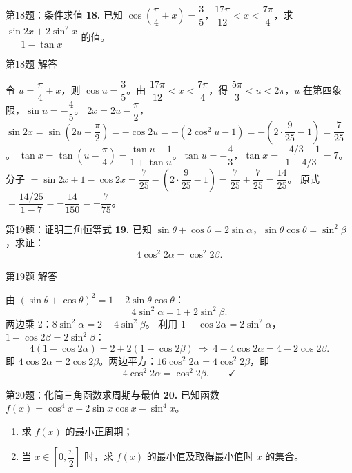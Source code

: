 \documentclass[10pt,aspectratio=169,serif]{beamer}
\begin{document}
\begin{frame}[t]{第18题：条件求值}
\textbf{18.} 已知 $\cos\!\left(\dfrac{\pi}{4}+x\right)=\dfrac35$，$\dfrac{17\pi}{12}<x<\dfrac{7\pi}{4}$，求 $\dfrac{\sin 2x+2\sin^2 x}{1-\tan x}$ 的值。
\end{frame}

\begin{frame}[t]{第18题 解答}
\begin{tcolorbox}[colback=orange!10,colframe=orange,title=\textbf{解}]
令 $u=\dfrac{\pi}{4}+x$，则 $\cos u=\dfrac35$。由 $\dfrac{17\pi}{12}<x<\dfrac{7\pi}{4}$，得 $\dfrac{5\pi}{3}<u<2\pi$，$u$ 在第四象限，$\sin u=-\dfrac45$。
$2x=2u-\dfrac{\pi}{2}$，$\sin 2x=\sin(2u-\dfrac{\pi}{2})=-\cos 2u=-(2\cos^2 u-1)=-(2\cdot\dfrac9{25}-1)=\dfrac7{25}$。
$\tan x=\tan(u-\dfrac{\pi}{4})=\dfrac{\tan u-1}{1+\tan u}$。$\tan u=-\dfrac43$，$\tan x=\dfrac{-4/3-1}{1-4/3}=7$。
分子 $=\sin 2x+1-\cos 2x=\dfrac7{25}-(2\cdot\dfrac9{25}-1)=\dfrac7{25}+\dfrac7{25}=\dfrac{14}{25}$。
原式 $=\dfrac{14/25}{1-7}=-\dfrac{14}{150}=-\dfrac{7}{75}$。
\end{tcolorbox}
\end{frame}

\begin{frame}[t]{第19题：证明三角恒等式}
\textbf{19.} 已知 $\sin\theta+\cos\theta=2\sin\alpha$，$\sin\theta\cos\theta=\sin^2\beta$，求证：
\[
4\cos^2 2\alpha=\cos^2 2\beta.
\]
\end{frame}

\begin{frame}[t]{第19题 解答}
\begin{tcolorbox}[colback=orange!10,colframe=orange,title=\textbf{证明}]
由 $(\sin\theta+\cos\theta)^2=1+2\sin\theta\cos\theta$：
\[
4\sin^2\alpha=1+2\sin^2\beta.
\]
两边乘 $2$：$8\sin^2\alpha=2+4\sin^2\beta$。
利用 $1-\cos 2\alpha=2\sin^2\alpha$，$1-\cos 2\beta=2\sin^2\beta$：
\[
4(1-\cos 2\alpha)=2+2(1-\cos 2\beta)\ \Longrightarrow\ 4-4\cos 2\alpha=4-2\cos 2\beta.
\]
即 $4\cos 2\alpha=2\cos 2\beta$。两边平方：$16\cos^2 2\alpha=4\cos^2 2\beta$，即
\[
4\cos^2 2\alpha=\cos^2 2\beta.\qquad\checkmark
\]
\end{tcolorbox}
\end{frame}

\begin{frame}[t]{第20题：化简三角函数求周期与最值}
\textbf{20.} 已知函数 $f(x)=\cos^4 x-2\sin x\cos x-\sin^4 x$。
\begin{enumerate}
  \item 求 $f(x)$ 的最小正周期；
  \item 当 $x\in\left[0,\dfrac{\pi}{2}\right]$ 时，求 $f(x)$ 的最小值及取得最小值时 $x$ 的集合。
\end{enumerate}
\end{frame}
\end{document}
